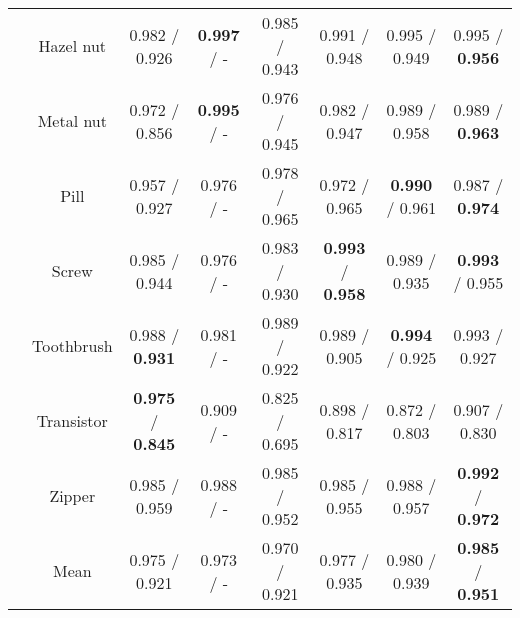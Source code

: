 \documentclass[letterpaper, 10 pt, conference]{ieeeconf}
\begin{document}
\begin{table*}
\begin{center}
{\begin{tabular}{cccccccc}
                          & Hazel nut  & {0.982 / 0.926} & {\textbf{0.997} / -}  & {0.985 / 0.943} & {0.991 / 0.948} & {0.995 / 0.949} & {0.995 / \textbf{0.956}} \\
                          & Metal nut  & {0.972 / 0.856} & {\textbf{0.995} / -}  & {0.976 / 0.945} & {0.982 / 0.947} & {0.989 / 0.958} & {0.989 / \textbf{0.963}} \\
                          & Pill       & {0.957 / 0.927} & {0.976 / -}  & {0.978 / 0.965} & {0.972 / 0.965} & {\textbf{0.990} / 0.961} & {0.987 / \textbf{0.974}} \\
                          & Screw      & {0.985 / 0.944} & {0.976 / -}  & {0.983 / 0.930} & {\textbf{0.993} / \textbf{0.958}} & {0.989 / 0.935} & {\textbf{0.993} / 0.955} \\
                          & Toothbrush & {0.988 / \textbf{0.931}} & {0.981 / -}  & {0.989 / 0.922} & {0.989 / 0.905} & {\textbf{0.994} / 0.925} & {0.993 / 0.927} \\
                          & Transistor & {\textbf{0.975} / \textbf{0.845}} & {0.909 / -}  & {0.825 / 0.695} & {0.898 / 0.817} & {0.872 / 0.803} & {0.907 / 0.830} \\
                          & Zipper     & {0.985 / 0.959} & {0.988 / -}  & {0.985 / 0.952} & {0.985 / 0.955} & {0.988 / 0.957} & {\textbf{0.992} / \textbf{0.972}} \\ \hline
\multicolumn{1}{l}{}      & Mean       & {0.975 / 0.921} & {0.973 / -}  & {0.970 / 0.921} & {0.977 / 0.935} & {0.980 / 0.939} & {\textbf{0.985} / \textbf{0.951}} \\ \hline
\end{tabular}
}
\end{center}
\end{table*}
\end{document}
